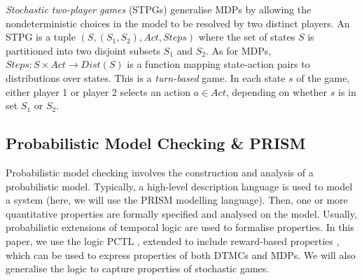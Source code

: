 \documentclass{llncs}
\begin{document}

\emph{Stochastic two-player games} (STPGs) generalise MDPs by allowing the nondeterministic choices
in the model to be resolved by two distinct players.
An STPG is a tuple $(S,(S_1,S_2),Act,Steps)$
where the set of states $S$ is partitioned into two disjoint subsets $S_1$ and $S_2$.
As for MDPs, $Steps:S\times Act\rightarrow Dist(S)$ is a function mapping
state-action pairs to distributions over states.
This is a \emph{turn-based} game. In each state $s$ of the game,
either player 1 or player 2 selects an action $a\in Act$,
depending on whether $s$ is in set $S_1$ or $S_2$.


\subsection{Probabilistic Model Checking \& PRISM}

Probabilistic model checking involves the construction and analysis of a probabilistic model.
Typically, a high-level description language is used to model a system
(here, we will use the PRISM \cite{KNP11} modelling language).
Then, one or more quantitative properties are formally specified and analysed on the model.
Usually, probabilistic extensions of temporal logic are used to formalise properties.
In this paper, we use the logic PCTL \cite{HJ94},
extended to include reward-based properties \cite{KNP07a},
which can be used to express properties of both DTMCs and MDPs.
We will also generalise the logic to capture properties of stochastic games.
\end{document}
